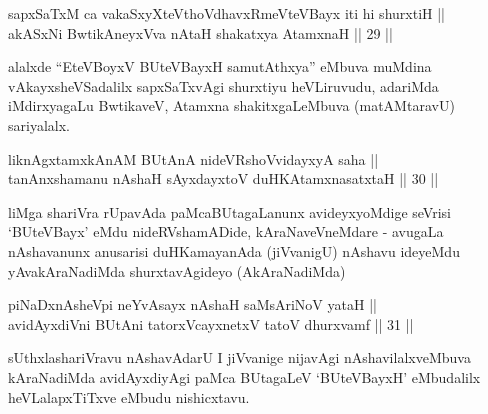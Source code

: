 
\begin{shl}
sapxSaTxM ca vakaSxyXteV\s thoVdhavxRmeVteVBayx iti hi shurxtiH || \\
akASxNi BwtikAneyxVva nAtaH shakatxya AtamxnaH \hfill || 29 ||
  
\end{shl}

\begin{artha}
alalxde ``EteVBoyxV BUteVBayxH samutAthxya'' eMbuva muMdina vAkayxsheVSadalilx sapxSaTxvAgi
shurxtiyu heVLiruvudu, adariMda iMdirxyagaLu BwtikaveV,
Atamxna shakitxgaLeMbuva (matAMtaravU) sariyalalx.
\end{artha}


\begin{shl}
liknAgxtamxkAnAM BUtAnA nideVRshoV\s vidayxyA saha || \\
tanAnxshamanu nAshaH sAyxdayxtoV duHKAtamxnasatxtaH \hfill || 30 ||
  
\end{shl}

\begin{artha}
liMga shariVra rUpavAda paMcaBUtagaLanunx avideyxyoMdige seVrisi
`BUteVBayx' eMdu nideRVshamADide, kAraNaveVneMdare - avugaLa
nAshavanunx anusarisi duHKamayanAda (jiVvanigU) nAshavu ideyeMdu
yAvakAraNadiMda shurxtavAgideyo (AkAraNadiMda)
\end{artha}


\begin{shl}
piNaDxnAsheV\s pi neYvAsayx nAshaH saMsAriNoV yataH || \\
\footnotemark[1]avidAyxdiVni BUtAni tatorxVcayxnetxV tatoV dhurxvamf \hfill || 31 ||
  
\end{shl}

\begin{artha}
sUthxlashariVravu nAshavAdarU I jiVvanige nijavAgi
nAshavilalxveMbuva kAraNadiMda avidAyxdiyAgi paMca BUtagaLeV
`BUteVBayxH' eMbudalilx heVLalapxTiTxve eMbudu nishicxtavu.
\end{artha}
